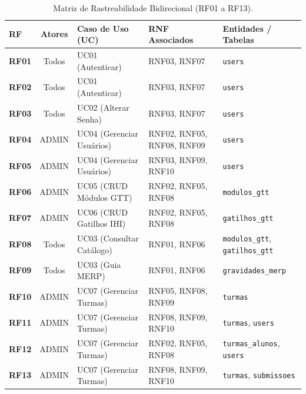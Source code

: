\begin{table}[htb]
\centering
\small
\caption{Matriz de Rastreabilidade Bidirecional (RF01 a RF13).}
\label{tab_matriz_rastreabilidade_1}
\begin{tabularx}{\textwidth}{l c >{\raggedright\arraybackslash}p{3.5cm} >{\raggedright\arraybackslash}X >{\raggedright\arraybackslash}p{3.8cm}}
\toprule
\textbf{RF} & \textbf{Atores} & \textbf{Caso de Uso (UC)} & \textbf{RNF Associados} & \textbf{Entidades / Tabelas} \\
\midrule
\textbf{RF01} & Todos & UC01 (Autenticar) & RNF03, RNF07 & \texttt{users} \\
\midrule
\textbf{RF02} & Todos & UC01 (Autenticar) & RNF03, RNF07 & \texttt{users} \\
\midrule
\textbf{RF03} & Todos & UC02 (Alterar Senha) & RNF03, RNF07 & \texttt{users} \\
\midrule
\textbf{RF04} & ADMIN & UC04 (Gerenciar Usuários) & RNF02, RNF05, RNF08, RNF09 & \texttt{users} \\
\midrule
\textbf{RF05} & ADMIN & UC04 (Gerenciar Usuários) & RNF03, RNF09, RNF10 & \texttt{users} \\
\midrule
\textbf{RF06} & ADMIN & UC05 (CRUD Módulos GTT) & RNF02, RNF05, RNF08 & \texttt{modulos\_gtt} \\
\midrule
\textbf{RF07} & ADMIN & UC06 (CRUD Gatilhos IHI) & RNF02, RNF05, RNF08 & \texttt{gatilhos\_gtt} \\
\midrule
\textbf{RF08} & Todos & UC03 (Consultar Catálogo) & RNF01, RNF06 & \texttt{modulos\_gtt}, \texttt{gatilhos\_gtt} \\
\midrule
\textbf{RF09} & Todos & UC03 (Guia MERP) & RNF01, RNF06 & \texttt{gravidades\_merp} \\
\midrule
\textbf{RF10} & ADMIN & UC07 (Gerenciar Turmas) & RNF05, RNF08, RNF09 & \texttt{turmas} \\
\midrule
\textbf{RF11} & ADMIN & UC07 (Gerenciar Turmas) & RNF08, RNF09, RNF10 & \texttt{turmas}, \texttt{users} \\
\midrule
\textbf{RF12} & ADMIN & UC07 (Gerenciar Turmas) & RNF02, RNF05, RNF08 & \texttt{turmas\_alunos}, \texttt{users} \\
\midrule
\textbf{RF13} & ADMIN & UC07 (Gerenciar Turmas) & RNF08, RNF09, RNF10 & \texttt{turmas}, \texttt{submissoes} \\
\bottomrule
\end{tabularx}
\end{table}


